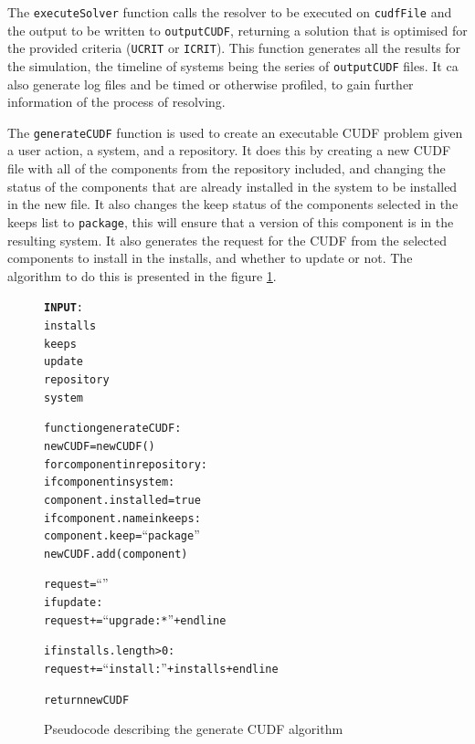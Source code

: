 The \verb+executeSolver+ function calls the resolver to be executed on \verb+cudfFile+ and the output to be written to \verb+outputCUDF+, 
returning a solution that is optimised for the provided criteria (\verb+UCRIT+ or \verb+ICRIT+).
This function generates all the results for the simulation, the timeline of systems being the series of \verb+outputCUDF+ files.
It ca also generate log files and be timed or otherwise profiled, to gain further information of the process of resolving.

The \verb+generateCUDF+ function is used to create an executable CUDF problem given a user action, a system, and a repository.
It does this by creating a new CUDF file with all of the components from the repository included, 
and changing the status of the components that are already installed in the system to be installed in the new file.
It also changes the keep status of the components selected in the keeps list to \verb+package+, this will ensure that a version of this component is in the resulting system.
It also generates the request for the CUDF from the selected components to install in the installs,
and whether to update or not.
The algorithm to do this is presented in the figure \ref{generateCUDF}.

\begin{figure}[htp]
\begin{center}
\begin{alltt}
\textbf{INPUT}:
installs
keeps
update
repository
system


function generateCUDF:
    newCUDF = new CUDF()
    for component in repository:
        if component in system:
            component.installed = true
            if component.name in keeps:
                component.keep = ``package''
        newCUDF.add(component)
    
    request = ``''
    if update:
        request += ``upgrade: *'' + endline
        
    if installs.length > 0:
        request += ``install: ''  + installs + endline
    
    return newCUDF
\end{alltt}
\caption[Generate CUDF Pseudocode]{Pseudocode describing the generate CUDF algorithm}
\label{generateCUDF}
\end{center}
\end{figure}

